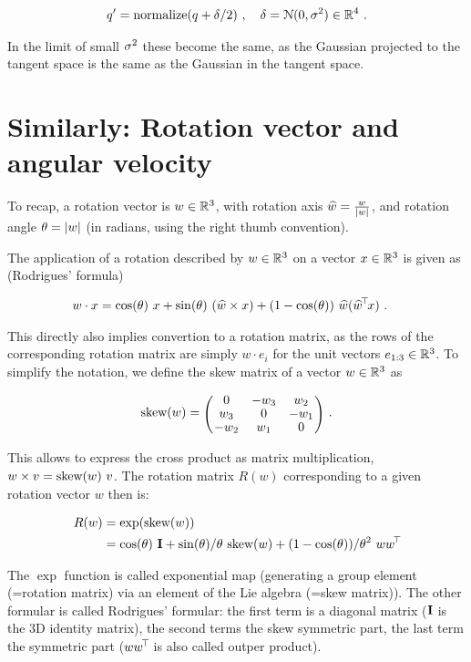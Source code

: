 \begin{align}
q' = \text{normalize}(q + \delta/2)~,\quad \delta = {\cal N}(0,\sigma^2) \in {\mathbb{R}}^4 ~.
\end{align}

In the limit of small $\sigma^2$ these become the same, as the Gaussian
projected to the tangent space is the same as the Gaussian in the
tangent space.

\appendix
\section{Similarly: Rotation vector and angular velocity}

To recap, a rotation vector is $w\in{\mathbb{R}}^3$, with rotation axis $\widehat w
= \frac{w}{|w|}$, and rotation angle $\theta = |w|$ (in
radians, using the right thumb convention).

The application of a rotation described by $w\in{\mathbb{R}}^3$ on a vector
$x\in{\mathbb{R}}^3$ is given as (Rodrigues' formula)

\begin{align}
w \cdot x
 &= \cos(\theta)~ x
  + \sin(\theta)~ (\widehat w\times x)
  + (1-\cos(\theta))~ \widehat w(\widehat w^{\!\top\!} x) ~.
\end{align}

This directly also implies convertion to a rotation matrix, as the
rows of the corresponding rotation matrix are simply $w \cdot e_i$ for
the unit vectors $e_{1:3}\in{\mathbb{R}}^3$. To simplify the notation, we
define the skew matrix of a vector $w\in{\mathbb{R}}^3$ as

\begin{align}
\skew(w) = \mat{ccc}{0 & -w_3 & w_2 \\ w_3 & 0 & -w_1 \\ -w_2 & w_1 & 0} ~.
\end{align}

This allows to express the cross
product as matrix multiplication, $w \times v = \text{skew}(w)~ v$. The rotation matrix $R(w)$ 
corresponding to a given rotation vector $w$ then is:

\begin{align}\label{eqRodriguez}
R(w)
 &= \exp(\text{skew}(w)) \\
 &= \cos(\theta)~ {\rm\bf I} + \sin(\theta)/\theta~ \text{skew}(w) + (1-\cos(\theta))/\theta^2~ w w^{\!\top\!}
\end{align}

The $\exp$ function is called exponential map (generating a group
element (=rotation matrix) via an element of the Lie algebra (=skew
matrix)). The other formular is called Rodrigues' formular: the first
term is a diagonal matrix (${\rm\bf I}$ is the 3D identity matrix), the second
terms the skew symmetric part, the last term the symmetric part ($w
w^{\!\top\!}$ is also called outper product).


